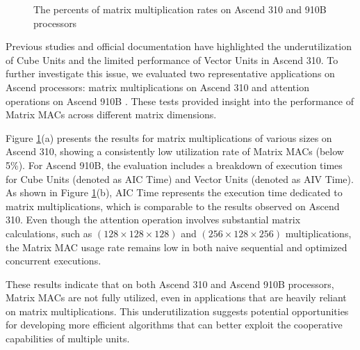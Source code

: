 \begin{figure}[tbp]
    \caption{The percents of matrix multiplication rates on Ascend 310 and 910B processors}
    \label{fig:back_flash}
    \end{figure}

Previous studies and official documentation \cite{moustafaaccelerating, cann_sugg} have highlighted the underutilization of Cube Units and the limited performance of Vector Units in Ascend 310. To further investigate this issue, we evaluated two representative applications on Ascend processors: matrix multiplications on Ascend 310 and attention operations on Ascend 910B \cite{DBLP:conf/nips/VaswaniSPUJGKP17}. These tests provided insight into the performance of Matrix MACs across different matrix dimensions.
    
Figure \ref{fig:back_flash}(a) presents the results for matrix multiplications of various sizes on Ascend 310, showing a consistently low utilization rate of Matrix MACs (below 5\%). For Ascend 910B, the evaluation includes a breakdown of execution times for Cube Units (denoted as AIC Time) and Vector Units (denoted as AIV Time). As shown in Figure \ref{fig:back_flash}(b), AIC Time represents the execution time dedicated to matrix multiplications, which is comparable to the results observed on Ascend 310. Even though the attention operation involves substantial matrix calculations, such as $(128 \times 128 \times 128)$ and $(256 \times 128 \times 256)$ multiplications, the Matrix MAC usage rate remains low in both naive sequential and optimized concurrent executions.

These results indicate that on both Ascend 310 and Ascend 910B processors, Matrix MACs are not fully utilized, even in applications that are heavily reliant on matrix multiplications. This underutilization suggests potential opportunities for developing more efficient algorithms that can better exploit the cooperative capabilities of multiple units.

